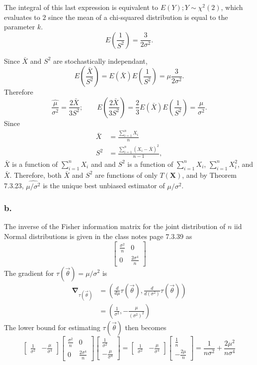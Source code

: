 \documentclass{article}
\begin{document}
\pagebreak
The integral of this last expression is equivalent to $E(Y); Y\sim\chi^2(2)$, which evaluates to $2$ since the mean of a chi-squared distribution is equal to the parameter $k$.
\[E\left(\frac{1}{S^2}\right) = \frac{3}{2\sigma^2}.\]

Since $\bar{X}$ and $S^2$ are stochastically independant, 
\[E\left(\frac{\bar{X}}{S^2}\right) = E(\bar{X})E\left(\frac{1}{S^2}\right) = \mu\frac{3}{2\sigma^2}.\]
Therefore \[\widehat{\frac{\mu}{\sigma^2}} = \frac{2\bar{X}}{3S^2}; \qquad E\left(\frac{2\bar{X}}{3S^2}\right) = \frac{2}{3}E(\bar{X})E\left(\frac{1}{S^2}\right) = \frac{\mu}{\sigma^2}.\] 
Since  
\begin{align*}
\bar{X} &= \frac{\sum_{i=1}^n X_i}{n} \\
S^2 &= \frac{\sum_{i=1}^n\left(X_i-\bar{X}\right)^2}{n-1},
\end{align*}
$\bar{X}$ is a function of $\sum_{i=1}^nX_i$ and and $S^2$ is a function of $\sum_{i=1}^nX_i$, $\sum_{i=1}^nX_i^2$, and $\bar{X}$. Therefore, both $\bar{X}$ and $S^2$ are functions of only $T(\mathbf{X})$, and by Theorem 7.3.23, $\widehat{\mu/\sigma^2}$ is the unique best unbiased estimator of $\mu/\sigma^2$.

\subsubsection*{b.}
The inverse of the Fisher information matrix for the joint distribution of $n$ iid Normal distributions is given in the class notes page 7.3.39 as 
\[\begin{bmatrix}
\frac{\sigma^2}{n} & 0 \\ 0 & \frac{2\sigma^4}{n}
\end{bmatrix}\]
The gradient for $\tau(\vec{\theta}) = \mu/\sigma^2$ is 
\begin{align*}
\mathbf{\nabla}_{\tau(\vec{\theta})} &= \left(\frac{d}{d\mu}\tau(\vec{\theta}), \frac{d}{d(\sigma^2)}\tau(\vec{\theta})\right) \\
&=\left(\frac{1}{\sigma^2}, -\frac{\mu}{\left(\sigma^2\right)^2}\right)
\end{align*}
The lower bound for estimating $\tau(\vec{\theta})$ then becomes
\[
\begin{bmatrix} \frac{1}{\sigma^2} & -\frac{\mu}{\sigma^4} \end{bmatrix}
\begin{bmatrix}\frac{\sigma^2}{n} & 0 \\ 0 & \frac{2\sigma^4}{n}\end{bmatrix}
\begin{bmatrix} \frac{1}{\sigma^2} \\ -\frac{\mu}{\sigma^4} \end{bmatrix}
= \begin{bmatrix} \frac{1}{\sigma^2} & -\frac{\mu}{\sigma^4} \end{bmatrix}
\begin{bmatrix} \frac{1}{n} \\ -\frac{2\mu}{n} \end{bmatrix}
=\frac{1}{n\sigma^2}+\frac{2\mu^2}{n\sigma^4}
\]
\end{document}
